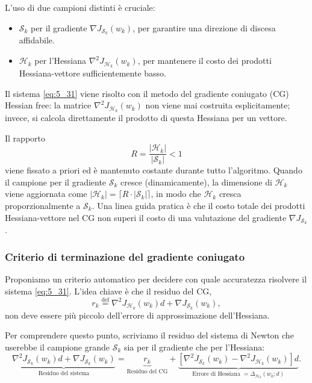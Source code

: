 \documentclass[a4paper,12pt]{article}
\numberwithin{equation}{section}
\numberwithin{figure}{section}
\numberwithin{table}{section}
\begin{document}
L'uso di due campioni distinti è cruciale:
\begin{itemize}
    \item \(\mathcal{S}_k\) per il gradiente \(\nabla J_{\mathcal{S}_k}(w_k)\), per garantire una direzione di discesa affidabile.
    \item \(\mathcal{H}_k\) per l'Hessiana \(\nabla^2 J_{\mathcal{H}_k}(w_k)\), per mantenere il costo dei prodotti Hessiana-vettore sufficientemente basso.
\end{itemize}

Il sistema \eqref{eq:5_31} viene risolto con il metodo del gradiente coniugato (CG) Hessian free: la matrice \(\nabla^2 J_{\mathcal{H}_k}(w_k)\) non viene mai costruita esplicitamente; invece, si calcola direttamente il prodotto di questa Hessiana per un vettore.

Il rapporto
\[
R = \frac{|\mathcal{H}_k|}{|\mathcal{S}_k|} < 1 \tag{5.32}\label{eq:5_32}
\]
viene fissato a priori ed è mantenuto costante durante tutto l'algoritmo. Quando il campione per il gradiente \(\mathcal{S}_k\) cresce (dinamicamente), la dimensione di \(\mathcal{H}_k\) viene aggiornata come \(|\mathcal{H}_k| = \lceil R \cdot |\mathcal{S}_k|\rceil\), in modo che \(\mathcal{H}_k\) cresca proporzionalmente a \(\mathcal{S}_k\). Una linea guida pratica è che il costo totale dei prodotti Hessiana-vettore nel CG non superi il costo di una valutazione del gradiente \(\nabla J_{\mathcal{S}_k}\).

\subsubsection{Criterio di terminazione del gradiente coniugato}\label{sec:criterio-cg}

Proponiamo un criterio automatico per decidere con quale accuratezza risolvere il sistema \eqref{eq:5_31}. L'idea chiave è che il residuo del CG,
\[
r_k \stackrel{\mathrm{def}}{=} \nabla^2 J_{\mathcal{H}_k}(w_k) d + \nabla J_{\mathcal{S}_k}(w_k), \tag{5.33}\label{eq:5_33}
\]
non deve essere più piccolo dell'errore di approssimazione dell'Hessiana.

Per comprendere questo punto, scriviamo il residuo del sistema di Newton che userebbe il campione grande \(\mathcal{S}_k\) sia per il gradiente che per l'Hessiana:
\[
\underbrace{\nabla^2 J_{\mathcal{S}_k}(w_k) d + \nabla J_{\mathcal{S}_k}(w_k)}_{\text{Residuo del sistema}}
= \underbrace{r_k}_{\text{Residuo del CG}} + \underbrace{\left[\nabla^2 J_{\mathcal{S}_k}(w_k) - \nabla^2 J_{\mathcal{H}_k}(w_k)\right] d}_{\text{Errore di Hessiana }= \Delta_{\mathcal{H}_k}(w_k; d)}. \tag{5.34}\label{eq:5_34}
\]
\end{document}
